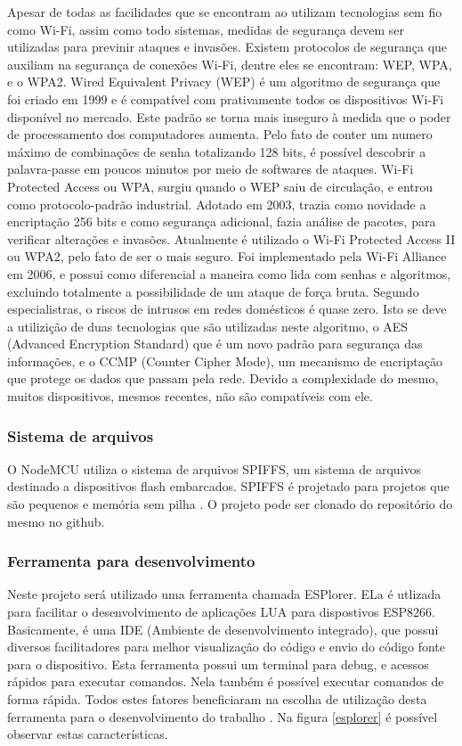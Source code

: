 \documentclass[journal]{IEEEtran}
\begin{document}
Apesar de todas as facilidades que se encontram ao utilizam tecnologias sem fio como Wi-Fi, assim como todo sistemas, medidas de segurança devem ser utilizadas para previnir ataques e invasões. Existem protocolos de segurança que auxiliam na segurança de conexões Wi-Fi, dentre eles se encontram: WEP, WPA, e o WPA2. Wired Equivalent Privacy (WEP) é um algoritmo de segurança que foi criado em 1999 e é compatível com prativamente todos os dispositivos Wi-Fi disponível no mercado. Este padrão se torna mais inseguro à medida que o poder de processamento dos computadores aumenta. Pelo fato de conter um numero máximo de combinações de senha totalizando 128 bits, é possível descobrir a palavra-passe em poucos minutos por meio de softwares de ataques. Wi-Fi Protected Access ou WPA, surgiu quando o WEP saiu de circulação, e entrou como protocolo-padrão industrial. Adotado em 2003, trazia como novidade a encriptação 256 bits e como segurança adicional, fazia análise de pacotes, para verificar alterações e invasões. Atualmente é utilizado o Wi-Fi Protected Access II ou WPA2, pelo fato de ser o mais seguro. Foi implementado pela Wi-Fi Alliance em 2006, e possui como diferencial a maneira como lida com senhas e algoritmos, excluindo totalmente a possibilidade de um ataque de força bruta. Segundo especialistras, o riscos de intrusos em redes domésticos é quase zero. Isto se deve a utilizição de duas tecnologias que são utilizadas neste algoritmo, o AES (Advanced Encryption Standard) que é um novo padrão para segurança das informações, e o CCMP (Counter Cipher Mode), um mecanismo de encriptação que protege os dados que passam pela rede. Devido a complexidade do mesmo, muitos dispositivos, mesmos recentes, não são compatíveis com ele. \cite{wifitecmundo}

\subsubsection{Sistema de arquivos}

O NodeMCU utiliza o sistema de arquivos SPIFFS, um sistema de arquivos destinado a dispositivos flash embarcados. SPIFFS é projetado para projetos que são pequenos e memória sem pilha \cite{SPIFFS}. O projeto pode ser clonado do repositório do mesmo no github.

\subsubsection{Ferramenta para desenvolvimento}

Neste projeto será utilizado uma ferramenta chamada ESPlorer. ELa é utlizada para facilitar o desenvolvimento de aplicações LUA para dispostivos ESP8266. Basicamente, é uma IDE (Ambiente de desenvolvimento integrado), que possui diversos facilitadores para melhor visualização do código e envio do código fonte para o dispositivo. Esta ferramenta possui um terminal para debug, e acessos rápidos para executar comandos. Nela também é possível executar comandos de forma rápida. Todos estes fatores beneficiaram na escolha de utilização desta ferramenta para o desenvolvimento do trabalho \cite{ESPlorer}. Na figura \ref{esplorer} é possível observar estas características.
\end{document}

